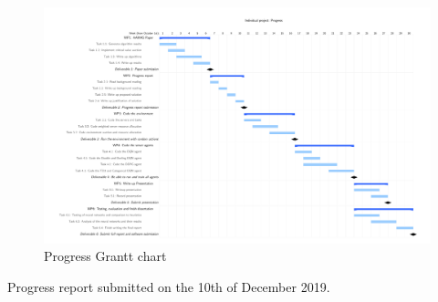 \begin{figure}[h]
    \centering
    \includegraphics[width=\linewidth]{extra/progress_grantt_chart.pdf}
    \caption{Progress Grantt chart}
    \label{fig:progress_grant_chart}
\end{figure}

Progress report submitted on the 10th of December 2019.


